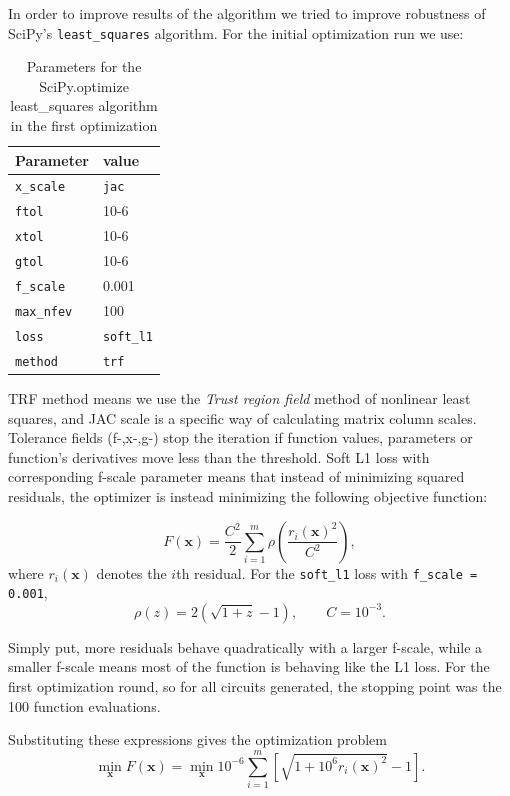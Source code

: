 \documentclass[
    11pt,
    a4paper,
    oneside
]{article}
\begin{document}
In order to improve results of the algorithm we tried to improve robustness of SciPy's \texttt{least\_squares} algorithm. 
For the initial optimization run we use:

\begin{table}[]
\centering
\begin{tabular}{l|l}
Parameter & value \\ \hline
\texttt{x\_scale} & \texttt{jac} \\
\texttt{ftol} &  10{-6}\\
\texttt{xtol} &  10{-6}\\
\texttt{gtol} &  10{-6}\\
\texttt{f\_scale} &  0.001\\
\texttt{max\_nfev} &  100\\
\texttt{loss} &  \texttt{soft\_l1}\\
\texttt{method} & \texttt{trf}
\end{tabular}
\label{parsopt1}
\caption{Parameters for the SciPy.optimize least\_squares algorithm in the first optimization}
\end{table}

TRF method means we use the \textit{Trust region field} method of nonlinear least squares, and JAC scale is a specific 
way of calculating matrix column scales. Tolerance fields (f-,x-,g-) stop the iteration if function values, parameters or function's derivatives
move less than the threshold. Soft L1 loss with corresponding f-scale parameter means that instead of minimizing squared residuals, the optimizer
is instead minimizing the following objective function:

\begin{equation}
    F(\boldsymbol{x})
    = \frac{C^2}{2}
      \sum_{i=1}^{m}
      \rho\left(\frac{r_i(\boldsymbol{x})^2}{C^2}\right),
\end{equation}
where $r_i(\boldsymbol{x})$ denotes the $i$th residual.
For the \texttt{soft\_l1} loss with \texttt{f\_scale = 0.001},
\begin{equation}
    \rho(z) = 2\left(\sqrt{1+z}-1\right),
    \qquad C = 10^{-3}.
\end{equation}

Simply put, more residuals behave quadratically with a larger f-scale, while a smaller f-scale means most of the function is behaving like
the L1 loss. For the first optimization round, so for all circuits generated, the stopping point was the 100 function evaluations.

Substituting these expressions gives the optimization problem
\begin{equation}
    \boxed{
        \min_{\boldsymbol{x}} F(\boldsymbol{x})
        =
        \min_{\boldsymbol{x}}
        10^{-6}\sum_{i=1}^{m}
        \left[
            \sqrt{1+10^{6}r_i(\boldsymbol{x})^2}-1
        \right].
    }
\end{equation}
\end{document}
